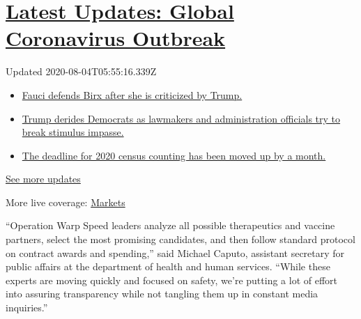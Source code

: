 \hypertarget{latest-updates-global-coronavirus-outbreak}{%
\section{\texorpdfstring{\href{https://www.nytimes3xbfgragh.onion/2020/08/03/world/coronavirus-covid-19.html?action=click\&pgtype=Article\&state=default\&region=MAIN_CONTENT_1\&context=storylines_live_updates}{Latest
Updates: Global Coronavirus
Outbreak}}{Latest Updates: Global Coronavirus Outbreak}}\label{latest-updates-global-coronavirus-outbreak}}

Updated 2020-08-04T05:55:16.339Z

\begin{itemize}
\tightlist
\item
  \href{https://www.nytimes3xbfgragh.onion/2020/08/03/world/coronavirus-covid-19.html?action=click\&pgtype=Article\&state=default\&region=MAIN_CONTENT_1\&context=storylines_live_updates\#link-4547638f}{Fauci
  defends Birx after she is criticized by Trump.}
\item
  \href{https://www.nytimes3xbfgragh.onion/2020/08/03/world/coronavirus-covid-19.html?action=click\&pgtype=Article\&state=default\&region=MAIN_CONTENT_1\&context=storylines_live_updates\#link-15e7f995}{Trump
  derides Democrats as lawmakers and administration officials try to
  break stimulus impasse.}
\item
  \href{https://www.nytimes3xbfgragh.onion/2020/08/03/world/coronavirus-covid-19.html?action=click\&pgtype=Article\&state=default\&region=MAIN_CONTENT_1\&context=storylines_live_updates\#link-e5a2cda}{The
  deadline for 2020 census counting has been moved up by a month.}
\end{itemize}

\href{https://www.nytimes3xbfgragh.onion/2020/08/03/world/coronavirus-covid-19.html?action=click\&pgtype=Article\&state=default\&region=MAIN_CONTENT_1\&context=storylines_live_updates}{See
more updates}

More live coverage:
\href{https://www.nytimes3xbfgragh.onion/live/2020/08/03/business/stock-market-today-coronavirus?action=click\&pgtype=Article\&state=default\&region=MAIN_CONTENT_1\&context=storylines_live_updates}{Markets}

``Operation Warp Speed leaders analyze all possible therapeutics and
vaccine partners, select the most promising candidates, and then follow
standard protocol on contract awards and spending,'' said Michael
Caputo, assistant secretary for public affairs at the department of
health and human services. ``While these experts are moving quickly and
focused on safety, we're putting a lot of effort into assuring
transparency while not tangling them up in constant media inquiries.''

